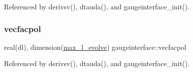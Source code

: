 Referenced by derivsv(), dtauda(), and gaugeinterface\+\_\+init().

\mbox{\label{namespacegaugeinterface_ae0aebf1ba68b305cd9abbe8bf79353d9}} 
\subsubsection{\texorpdfstring{vecfacpol}{vecfacpol}}
{\footnotesize\ttfamily real(dl), dimension(\mbox{\hyperlink{namespacegaugeinterface_a965f8caba9ba282e718281110e274b04}{max\+\_\+l\+\_\+evolve}}) gaugeinterface\+::vecfacpol}



Referenced by derivsv(), dtauda(), and gaugeinterface\+\_\+init().


